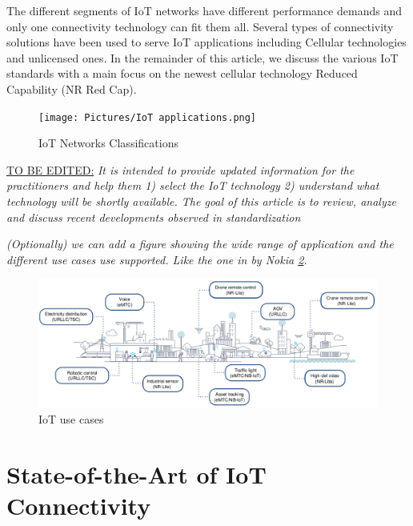 \documentclass[]{IEEEtran}
\begin{document}
The different segments of IoT networks have different performance demands and only one connectivity technology can fit them all. Several types of connectivity solutions have been used to serve IoT applications including Cellular technologies and unlicensed ones. In the remainder of this article, we discuss the various IoT standards with a main focus on the newest cellular technology Reduced Capability (NR Red Cap).
\begin{figure}
\centerline{\texttt{[image: Pictures/IoT applications.png]}}
\caption{IoT Networks Classifications}
\label{fig:IoT_applications}
\end{figure}




\underline{TO BE EDITED:} \emph{It is intended to provide updated information for the practitioners and help them 1) select the IoT technology 2) understand what technology will be shortly available. The goal of this article is to review, analyze and discuss recent developments observed in standardization}

\textit{(Optionally) we can add a figure showing the wide range of application and the different use cases  use supported. Like the one in by Nokia \ref{fig:iot-use-cases}.}

\begin{figure}
    \centering
    \includegraphics[width=\linewidth]{Pictures/IoT Use Cases.png}
    \caption{IoT use cases}
    \label{fig:iot-use-cases}
\end{figure}






\section{State-of-the-Art of IoT Connectivity}
\label{sec:2-IoT-Connectivity}


\end{document}

